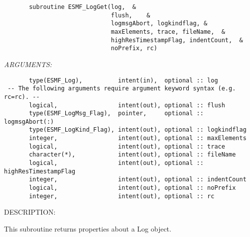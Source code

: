  
\begin{verbatim}       subroutine ESMF_LogGet(log,  &
                              flush,    &
                              logmsgAbort, logkindflag, &
                              maxElements, trace, fileName,  &
                              highResTimestampFlag, indentCount,  &
                              noPrefix, rc)\end{verbatim}{\em ARGUMENTS:}
\begin{verbatim}       type(ESMF_Log),          intent(in),  optional :: log
 -- The following arguments require argument keyword syntax (e.g. rc=rc). --
       logical,                 intent(out), optional :: flush
       type(ESMF_LogMsg_Flag),  pointer,     optional :: logmsgAbort(:)
       type(ESMF_LogKind_Flag), intent(out), optional :: logkindflag
       integer,                 intent(out), optional :: maxElements
       logical,                 intent(out), optional :: trace
       character(*),            intent(out), optional :: fileName
       logical,                 intent(out), optional :: highResTimestampFlag
       integer,                 intent(out), optional :: indentCount
       logical,                 intent(out), optional :: noPrefix
       integer,                 intent(out), optional :: rc
 \end{verbatim}
{\sf DESCRIPTION:\\ }


        This subroutine returns properties about a Log object.
  
